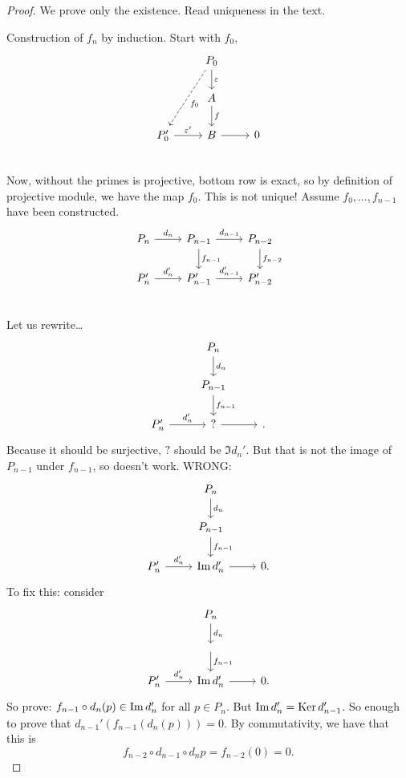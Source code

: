 \begin{proof}
    We prove only the existence. Read uniqueness in the text.

    Construction of $f_n$ by induction.
    Start with $f_0$, 
    \[
        \begin{tikzcd}
            & P_0  \arrow[d, "\epsilon"] \arrow[ddl, "f_0", dashed]&\\
            & A \arrow[d, "f"]& \\
            P_0' \arrow[r, "\epsilon'"]& B \arrow[r, ""]&0 \\
        \end{tikzcd}
    \]
    Now, without the primes is projective, bottom row is exact, so by definition of projective module, we have the map $f_0$. This is not unique!
    Assume $f_0, \ldots, f_{n-1}$ have been constructed.
    \[
        \begin{tikzcd}
            P_n \arrow[r, "d_n"] &
            P_{n-1} \arrow[r, "d_{n-1}"] \arrow[d, "f_{n-1}"]&
            P_{n-2} \arrow[d, "f_{n-2}"]\\
            P'_n \arrow[r, "d'_n"] &
            P'_{n-1} \arrow[r, "d'_{n-1}"] &
            P'_{n-2}\\
        \end{tikzcd}
    \]
    Let us rewrite\ldots
    \[
        \begin{tikzcd}
            & P_n \arrow[d, "d_n"]& \\
            & P_{n-1} \arrow[d, "f_{n-1}"]& \\
            P_n' \arrow[r, "d_n'"] & ? \arrow[r, ""]& .
        \end{tikzcd}
    \]
    Because it should be surjective, $?$ should be $\Im d_n'$. But that is not the image of  $P_{n-1}$ under $f_{n-1}$, so doesn't work. WRONG:
    \[
        \begin{tikzcd}
            & P_n \arrow[d, "d_n"]& \\
            & P_{n-1} \arrow[d, "f_{n-1}"]& \\
            P_n' \arrow[r, "d_n'"] & \im d_n' \arrow[r, ""]& 0.
        \end{tikzcd}
    \]
    To fix this: consider
    \[
        \begin{tikzcd}
            & P_n \arrow[d, "d_n"]& \\
            &  \arrow[d, "f_{n-1}"]& \\
            P_n' \arrow[r, "d_n'"] & \im d_n' \arrow[r, ""]& 0.
        \end{tikzcd}
    \]
    So prove: $f_{n-1}  \circ d_n(p) \in \operatorname{Im} d_n'$ for all $p \in P_n$.
    But $\operatorname{Im} d_n' = \operatorname{Ker} d_{n-1}'$.
    So enough to prove that $d_{n-1}' ( f_{n-1}(d_n(p))) = 0$.
    By commutativity, we have that this is
    \[
        f_{n-2}  \circ  d_{n-1}  \circ  d_n p = f_{n-2}(0) = 0
    .\] 
\end{proof}

